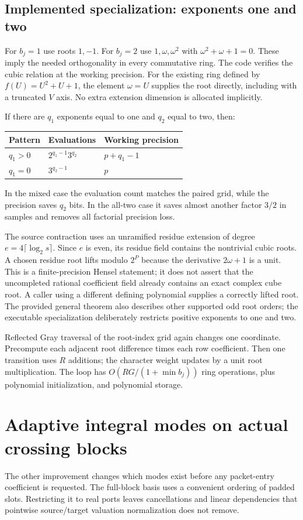 \documentclass[11pt,letterpaper]{article}
\theoremstyle{definition}\newtheorem{definition}[theorem]{Definition}
\theoremstyle{remark}\newtheorem{remark}[theorem]{Remark}
\begin{document}
\subsection{Implemented specialization: exponents one and two}
For $b_j=1$ use roots $1,-1$. For $b_j=2$ use $1,\omega,\omega^2$ with
$\omega^2+\omega+1=0$. These imply the needed orthogonality in every
commutative ring. The code verifies the cubic relation at the working
precision. For the existing ring defined by $f(U)=U^2+U+1$, the element
$\omega=U$ supplies the root directly, including with a truncated $V$ axis.
No extra extension dimension is allocated implicitly.

If there are $q_1$ exponents equal to one and $q_2$ equal to two, then:
\begin{center}
\begin{tabular}{@{}lll@{}}
\toprule Pattern & Evaluations & Working precision\\\midrule
$q_1>0$ & $2^{q_1-1}3^{q_2}$ & $p+q_1-1$\\
$q_1=0$ & $3^{q_2-1}$ & $p$\\\bottomrule
\end{tabular}
\end{center}
In the mixed case the evaluation count matches the paired grid, while
the precision saves $q_2$ bits. In the all-two case it saves almost another
factor $3/2$ in samples and removes all factorial precision loss.

The source contraction uses an unramified residue extension of degree
$e=4\lceil\log_2s\rceil$. Since $e$ is even, its residue field contains
the nontrivial cubic roots. A chosen residue root lifts modulo $2^P$ because
the derivative $2\omega+1$ is a unit. This is a finite-precision Hensel
statement; it does not assert that the uncompleted rational coefficient
field already contains an exact complex cube root. A caller using a
different defining polynomial supplies a correctly lifted root. The
provided general theorem also describes other supported odd root orders;
the executable specialization deliberately restricts positive exponents
to one and two.

Reflected Gray traversal of the root-index grid again changes one coordinate.
Precompute each adjacent root difference times each row coefficient.
Then one transition uses $R$ additions; the character weight updates by a
unit root multiplication. The loop has $O(RG/(1+\min b_j))$ ring
operations, plus polynomial initialization, and polynomial storage.

\section{Adaptive integral modes on actual crossing blocks}
\label{sec:adaptive}
The other improvement changes which modes exist before any packet-entry
coefficient is requested. The full-block basis uses a convenient ordering
of padded slots. Restricting it to real ports leaves cancellations and
linear dependencies that pointwise source/target valuation normalization
does not remove.
\end{document}
